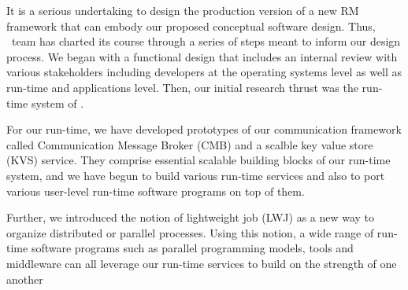 It is a serious undertaking 
to design the production version of a new 
RM framework that can embody our proposed conceptual software design.
Thus, \flux\ team has charted its course through a series of steps
meant to inform our design process. 
We began with a functional design that includes an
internal review with various stakeholders including 
developers at the operating systems level
as well as run-time and applications level.
Then, our initial research thrust was the run-time system of \flux.

%
For our run-time, we have developed prototypes of our communication framework 
called Communication Message Broker (CMB) 
and a scalble key value store (KVS) service.
They comprise essential scalable building blocks of our run-time system, 
and we have begun to build various run-time services and also 
to port various user-level run-time software programs on top of them.

Further, we introduced the notion of lightweight 
job (LWJ) as a new way to organize distributed or parallel processes.
Using this notion, a wide range of run-time software
programs such as parallel programming models,
tools and middleware can all leverage our run-time services 
to build on the strength of one another 

\ifcomments
{}
\fi
